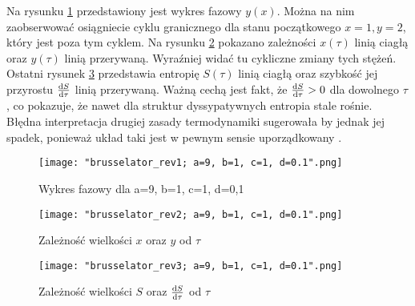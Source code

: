 \documentclass[10pt, a4paper, twoside, onecolumn]{article}
\numberwithin{equation}{section}
\begin{document}
	Na rysunku \ref{fig:rev_brus_fazowy} przedstawiony jest wykres fazowy \(y(x)\). Można na nim zaobserwować osiągniecie cyklu granicznego dla stanu początkowego \(x=1, y=2\), który jest poza tym cyklem. Na rysunku \ref{fig:rev_brus_xy_t} pokazano zależności \(x(\tau)\) linią ciagłą oraz \(y(\tau)\) linią przerywaną. Wyraźniej widać tu cykliczne zmiany tych stężeń. Ostatni rysunek \ref{fig:rev_brus_entropia} przedstawia entropię \(S(\tau)\) linią ciagłą oraz szybkość jej przyrostu \(\dv{S}{\tau}(\tau)\) linią przerywaną. Ważną cechą jest fakt, że \(\dv{S}{\tau}(\tau)>0\) dla dowolnego \(\tau\), co pokazuje, że nawet dla struktur dyssypatywnych entropia stale rośnie. Błędna interpretacja drugiej zasady termodynamiki sugerowała by jednak jej spadek, ponieważ układ taki jest w pewnym sensie uporządkowany \cite{orlik_sily_w_przyrodzie}.
	\begin{figure}[H]
		\centering
		\texttt{[image: "brusselator\_rev1; a=9, b=1, c=1, d=0.1".png]}
		\caption{Wykres fazowy dla a=9, b=1, c=1, d=0,1}
		\label{fig:rev_brus_fazowy}
	\end{figure}
	\begin{figure}[H]
		\centering
		\texttt{[image: "brusselator\_rev2; a=9, b=1, c=1, d=0.1".png]}
		\caption{Zależność wielkości \(x\) oraz \(y\) od \(\tau\)}
		\label{fig:rev_brus_xy_t}
	\end{figure}
	\begin{figure}[H]
		\centering
		\texttt{[image: "brusselator\_rev3; a=9, b=1, c=1, d=0.1".png]}
		\caption{Zależność wielkości \(S\) oraz \(\dv{S}{\tau}\) od \(\tau\)}
		\label{fig:rev_brus_entropia}
	\end{figure}
	
\end{document}
